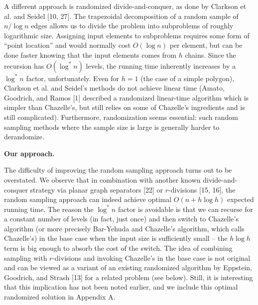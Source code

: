 \par
\par
A different approach is randomized divide-and-conquer, as done by Clarkson et al. and Seidel [10, 27]. The trapezoidal decomposition of a random sample of $n/\log n$ edges allows us to divide the problem into subproblems of roughly logarithmic size. Assigning input elements to subproblems requires some form of “point location” and would normally cost $O(\log n)$ per element, but can be done faster knowing that the input elements comes from $h$ chains. Since the recursion has $O(\log^{*}n)$ levels, the running time inherently increases by a $\log^{*}n$ factor, unfortunately. Even for $h=1$ (the case of a simple polygon), Clarkson et al. and Seidel’s methods do not achieve linear time (Amato, Goodrich, and Ramos [1] described a randomized linear-time algorithm which is simpler than Chazelle’s, but still relies on some of Chazelle’s ingredients and is still complicated). Furthermore, randomization seems essential: such random sampling methods where the sample size is large is generally harder to derandomize.
\par
\par
\par\medskip\noindent\textbf{Our approach.}\par
The difficulty of improving the random sampling approach turns out to be overstated. We observe that in combination with another known divide-and-conquer strategy via planar graph separators [22] or $r$-divisions [15, 16], the random sampling approach can indeed achieve optimal $O(n+h\log h)$ expected running time. The reason the $\log^{*}n$ factor is avoidable is that we can recurse for a constant number of levels (in fact, just once) and then switch to Chazelle’s algorithm (or more precisely Bar-Yehuda and Chazelle’s algorithm, which calls Chazelle’s) in the base case when the input size is sufficiently small – the $h\log h$ term is big enough to absorb the cost of the switch. The idea of combining sampling with $r$-divisions and invoking Chazelle’s in the base case is not original and can be viewed as a variant of an existing randomized algorithm by Eppstein, Goodrich, and Strash [13] for a related problem (see below). Still, it is interesting that this implication has not been noted earlier, and we include this optimal randomized solution in Appendix A.
\par
